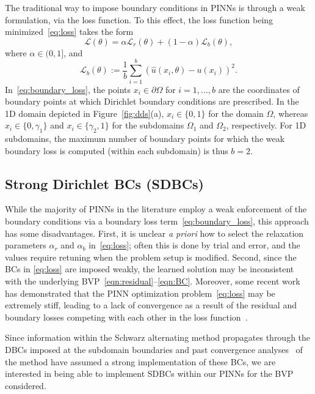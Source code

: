 \documentclass[oneside,final]{csri23}
\begin{document}
The traditional way to impose boundary conditions in PINNs is through a weak formulation, via the loss function. To this effect, the loss function being minimized~\eqref{eq:loss} takes the form 
\begin{equation} \label{eq:loss2}
    \mathcal{L}(\theta) = \alpha \mathcal{L}_r(\theta) + (1-\alpha)\mathcal{L}_b(\theta),
\end{equation}
where $\alpha \in (0,1]$, and 
\begin{equation} \label{eq:boundary_loss}
    \mathcal{L}_b(\theta) := \frac{1}{b}\sum_{i=1}^b\left(\hat{u}(x_i, \theta) - u(x_i) \right)^2.
\end{equation}
In~\eqref{eq:boundary_loss}, the points $x_i \in \partial \Omega$ for $i = 1, ..., b$ are the coordinates of boundary points at which Dirichlet boundary conditions are prescribed. In the 1D domain depicted in Figure~\ref{fig:dds}(a), $x_i \in \{ 0,1\}$ for the domain $\Omega$, whereas $x_i \in \{0, \gamma_1\}$ and $x_i \in \{ \gamma_2, 1\}$ for the subdomains $\Omega_1$ and $\Omega_2$, respectively. For 1D subdomains, the maximum number of boundary points for which the weak boundary loss is computed (within each subdomain) is thus $b = 2$.

\subsection{Strong Dirichlet BCs (SDBCs)} \label{WDS:sec_SDBC}

While the majority of PINNs in the literature employ a weak enforcement of the boundary conditions via a boundary loss term~\eqref{eq:boundary_loss}, this approach has some disadvantages. First, it is unclear \textit{a priori} how to select the relaxation parameters $\alpha_r$ and $\alpha_b$ in~\eqref{eq:loss}; often this is done by trial and error, and the values require retuning when the problem setup is modified.  Second, since the BCs in \eqref{eq:loss} are imposed weakly, the learned solution may be inconsistent with the underlying BVP~\eqref{eqn:residual}--\eqref{eqn:BC}. Moreover, some recent work has demonstrated that the PINN optimization problem~\eqref{eq:loss} may be extremely stiff, leading to a lack of convergence as a result of the residual and boundary losses competing with each other in the loss function~\cite{WDS:Wang:2021, WDS:Sun:2020}.

Since information within the Schwarz alternating method propagates through the DBCs imposed at the subdomain boundaries and past convergence analyses~\cite{WDS:Lions1988, WDS:mota2017schwarz, WDS:mota2022schwarz} of the method have assumed a strong implementation of these BCs, we are interested in being able to implement SDBCs within our PINNs for the BVP considered. 
\end{document}
